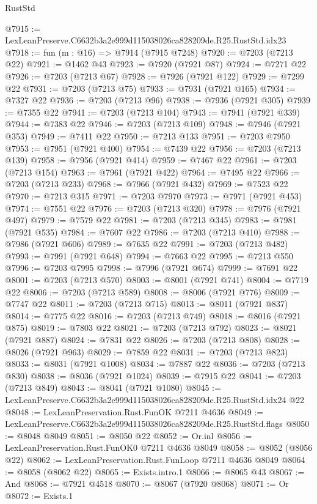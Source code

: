 \begin{lexlean}{RustStd}
\begin{coremodule}
@7915 := LexLeanPreserve.C6632b3a2e999d115038026ca828209de.R25.RustStd.idx23
@7918 := fun (m : @16) => @7914 (@7915 @7248)
@7920 := @7203 (@7213 @22)
@7921 := @1462 @43
@7923 := @7920 (@7921 @87)
@7924 := @7271 @22
@7926 := @7203 (@7213 @67)
@7928 := @7926 (@7921 @122)
@7929 := @7299 @22
@7931 := @7203 (@7213 @75)
@7933 := @7931 (@7921 @165)
@7934 := @7327 @22
@7936 := @7203 (@7213 @96)
@7938 := @7936 (@7921 @305)
@7939 := @7355 @22
@7941 := @7203 (@7213 @104)
@7943 := @7941 (@7921 @339)
@7944 := @7383 @22
@7946 := @7203 (@7213 @109)
@7948 := @7946 (@7921 @353)
@7949 := @7411 @22
@7950 := @7213 @133
@7951 := @7203 @7950
@7953 := @7951 (@7921 @400)
@7954 := @7439 @22
@7956 := @7203 (@7213 @139)
@7958 := @7956 (@7921 @414)
@7959 := @7467 @22
@7961 := @7203 (@7213 @154)
@7963 := @7961 (@7921 @422)
@7964 := @7495 @22
@7966 := @7203 (@7213 @233)
@7968 := @7966 (@7921 @432)
@7969 := @7523 @22
@7970 := @7213 @315
@7971 := @7203 @7970
@7973 := @7971 (@7921 @453)
@7974 := @7551 @22
@7976 := @7203 (@7213 @320)
@7978 := @7976 (@7921 @497)
@7979 := @7579 @22
@7981 := @7203 (@7213 @345)
@7983 := @7981 (@7921 @535)
@7984 := @7607 @22
@7986 := @7203 (@7213 @410)
@7988 := @7986 (@7921 @606)
@7989 := @7635 @22
@7991 := @7203 (@7213 @482)
@7993 := @7991 (@7921 @648)
@7994 := @7663 @22
@7995 := @7213 @550
@7996 := @7203 @7995
@7998 := @7996 (@7921 @674)
@7999 := @7691 @22
@8001 := @7203 (@7213 @570)
@8003 := @8001 (@7921 @741)
@8004 := @7719 @22
@8006 := @7203 (@7213 @589)
@8008 := @8006 (@7921 @776)
@8009 := @7747 @22
@8011 := @7203 (@7213 @715)
@8013 := @8011 (@7921 @837)
@8014 := @7775 @22
@8016 := @7203 (@7213 @749)
@8018 := @8016 (@7921 @875)
@8019 := @7803 @22
@8021 := @7203 (@7213 @792)
@8023 := @8021 (@7921 @887)
@8024 := @7831 @22
@8026 := @7203 (@7213 @808)
@8028 := @8026 (@7921 @963)
@8029 := @7859 @22
@8031 := @7203 (@7213 @823)
@8033 := @8031 (@7921 @1008)
@8034 := @7887 @22
@8036 := @7203 (@7213 @830)
@8038 := @8036 (@7921 @1024)
@8039 := @7915 @22
@8041 := @7203 (@7213 @849)
@8043 := @8041 (@7921 @1080)
@8045 := LexLeanPreserve.C6632b3a2e999d115038026ca828209de.R25.RustStd.idx24 @22
@8048 := LexLeanPreservation.Rust.FunOK @7211 @4636
@8049 := LexLeanPreserve.C6632b3a2e999d115038026ca828209de.R25.RustStd.flags
@8050 := @8048 @8049
@8051 := @8050 @22
@8052 := Or.inl
@8056 := LexLeanPreservation.Rust.FunOK0 @7211 @4636 @8049
@8058 := @8052 (@8056 @22)
@8062 := LexLeanPreservation.Rust.FunLoop @7211 @4636 @8049
@8064 := @8058 (@8062 @22)
@8065 := Exists.intro.{1}
@8066 := @8065 @43
@8067 := And
@8068 := @7921 @4518
@8070 := @8067 (@7920 @8068)
@8071 := Or
@8072 := Exists.{1}

\end{coremodule}
\end{lexlean}
